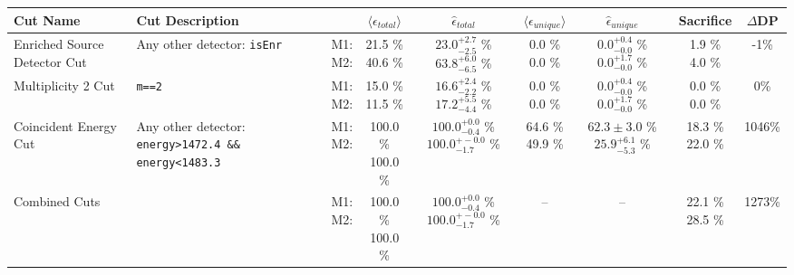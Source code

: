 \small
\begin{tabular}{|>{\raggedright}m{3cm}|m{6cm}|c c c|c c|c|c|}
\hline
  Cut Name & Cut Description &   & $\langle\epsilon_{total}\rangle$ & $\hat{\epsilon}_{total}$ & $\langle\epsilon_{unique}\rangle$ & $\hat{\epsilon}_{unique}$ & Sacrifice & $\Delta$DP \\
\hline
  Enriched Source Detector Cut & \tiny Any other detector: \texttt{isEnr} & \makecell{M1: \\ M2:} & \makecell{21.5 \% \\ 40.6 \%} & \makecell{$23.0^{+2.7}_{-2.5}$ \% \\ $63.8^{+6.0}_{-6.5}$ \%} & \makecell{0.0 \% \\ 0.0 \%} & \makecell{$0.0^{+0.4}_{-0.0}$ \% \\ $0.0^{+1.7}_{-0.0}$ \%} & \makecell{1.9 \% \\ 4.0 \%} & -1\% \\
  Multiplicity 2 Cut & \tiny  \texttt{m==2} & \makecell{M1: \\ M2:} & \makecell{15.0 \% \\ 11.5 \%} & \makecell{$16.6^{+2.4}_{-2.2}$ \% \\ $17.2^{+5.5}_{-4.4}$ \%} & \makecell{0.0 \% \\ 0.0 \%} & \makecell{$0.0^{+0.4}_{-0.0}$ \% \\ $0.0^{+1.7}_{-0.0}$ \%} & \makecell{0.0 \% \\ 0.0 \%} & 0\% \\
  Coincident Energy Cut & \tiny Any other detector: \texttt{energy>1472.4 \&\& energy<1483.3} & \makecell{M1: \\ M2:} & \makecell{100.0 \% \\ 100.0 \%} & \makecell{$100.0^{+0.0}_{-0.4}$ \% \\ $100.0^{+-0.0}_{-1.7}$ \%} & \makecell{64.6 \% \\ 49.9 \%} & \makecell{$62.3 \pm 3.0$ \% \\ $25.9^{+6.1}_{-5.3}$ \%} & \makecell{18.3 \% \\ 22.0 \%} & 1046\% \\
  Combined Cuts &  & \makecell{M1: \\ M2:} & \makecell{100.0 \% \\ 100.0 \%} & \makecell{$100.0^{+0.0}_{-0.4}$ \% \\ $100.0^{+-0.0}_{-1.7}$ \%} & -- & -- & \makecell{22.1 \% \\ 28.5 \%} & 1273\% \\
\hline
\end{tabular}
